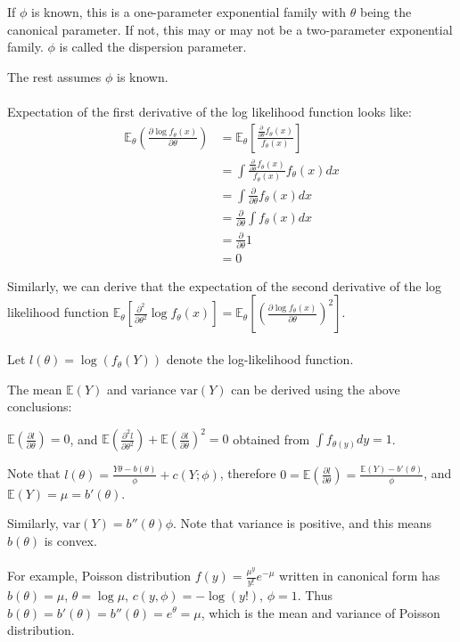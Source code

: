 \documentclass{article}
\begin{document}
If $\phi$ is known, this is a one-parameter exponential family with $\theta$ being the canonical parameter.
If not, this may or may not be a two-parameter exponential family.
$\phi$ is called the dispersion parameter.

The rest assumes $\phi$ is known.
\\
\\

Expectation of the first derivative of the log likelihood function looks like:
\begin{align*}
  \mathbb{E}_{\theta}(\frac{\partial \log{f_{\theta}(x)}}{\partial \theta})
    &= \mathbb{E}_{\theta}[\frac{\frac{\partial}{\partial \theta} f_{\theta}(x)}{f_{\theta}(x)}] \\
    &= \int \frac{\frac{\partial}{\partial \theta} f_{\theta}(x)}{f_{\theta}(x)} f_{\theta}(x) dx \\
    &= \int \frac{\partial}{\partial \theta} f_{\theta}(x) dx \\
    &= \frac{\partial}{\partial \theta} \int f_{\theta}(x) dx \\
    &= \frac{\partial}{\partial \theta} 1 \\
    &= 0
\end{align*}

Similarly, we can derive that the expectation of the second derivative of the log likelihood function
$\mathbb{E}_{\theta}[\frac{\partial^2 }{\partial \theta^2 } \log f_{\theta}(x)] = \mathbb{E}_{\theta}[(\frac{\partial \log{f_{\theta}(x)}}{\partial \theta})^2]$.
\\
\\
Let $l(\theta) = \log (f_{\theta} (Y))$ denote the log-likelihood function.

The mean $\mathbb{E}(Y)$ and variance $\text{var}(Y)$ can be derived using the above conclusions:

$\mathbb{E}(\frac{\partial l}{\partial \theta}) = 0$, and
$\mathbb{E}(\frac{\partial^2 l}{\partial \theta^2}) + \mathbb{E}(\frac{\partial l}{\partial \theta})^2 = 0$
obtained from $\int f_{\theta(y)} dy = 1$.

Note that $l(\theta) = \frac{Y \theta - b(\theta)}{\phi} + c(Y; \phi)$,
therefore $0 = \mathbb{E}(\frac{\partial l}{\partial \theta}) = \frac{\mathbb{E}(Y) - b'(\theta)}{\phi}$,
and $\mathbb{E}(Y) = \mu = b'(\theta)$.

Similarly, $\text{var}(Y) = b''(\theta) \phi$.
Note that variance is positive, and this means $b(\theta)$ is convex.
\\
\\
For example, Poisson distribution $f(y) = \frac{\mu^y}{y!} e^{-\mu}$ written in canonical form has $b(\theta) = \mu$,
$\theta = \log \mu$, $c(y, \phi) = - \log (y!)$, $\phi = 1$.
Thus $b(\theta) = b'(\theta) = b''(\theta) = e^{\theta} = \mu$, which is the mean and variance of Poisson distribution.
\\
\\
\end{document}
